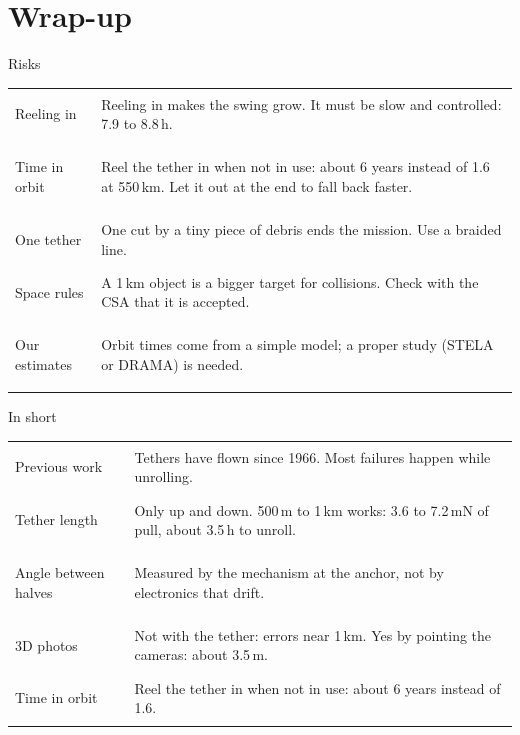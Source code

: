 \documentclass[aspectratio=169,11pt]{beamer}
\begin{document}
\section{Wrap-up}
\begin{frame}{Risks}
\renewcommand{\arraystretch}{1.45}
\begin{tabular}{@{}>{\bfseries\raggedright\arraybackslash}p{3.0cm}p{10.4cm}@{}}
\toprule
Reeling in & Reeling in makes the swing grow. It must be slow and controlled: 7.9 to 8.8\,h. \\
Time in orbit & Reel the tether in when not in use: about 6 years instead of 1.6 at 550\,km. Let it out at the end to fall back faster. \\
One tether & One cut by a tiny piece of debris ends the mission. Use a braided line. \\
Space rules & A 1\,km object is a bigger target for collisions. Check with the CSA that it is accepted. \\
Our estimates & Orbit times come from a simple model; a proper study (STELA or DRAMA) is needed. \\
\bottomrule
\end{tabular}
\end{frame}
\begin{frame}{In short}
\renewcommand{\arraystretch}{1.5}
\begin{tabular}{@{}>{\bfseries\raggedright\arraybackslash}p{3.0cm}p{10.4cm}@{}}
\toprule
Previous work & Tethers have flown since 1966. Most failures happen while unrolling. \\
Tether length & Only up and down. 500\,m to 1\,km works: 3.6 to 7.2\,mN of pull, about 3.5\,h to unroll. \\
Angle between halves & Measured by the mechanism at the anchor, not by electronics that drift. \\
3D photos & Not with the tether: errors near 1\,km. Yes by pointing the cameras: about 3.5\,m. \\
Time in orbit & Reel the tether in when not in use: about 6 years instead of 1.6. \\
\bottomrule
\end{tabular}
\end{frame}
\end{document}
